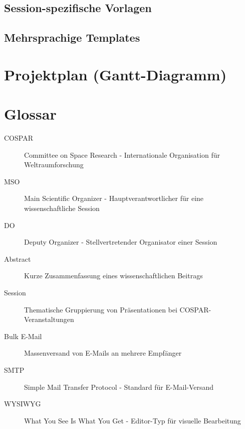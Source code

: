\documentclass[11pt,a4paper]{article}
\begin{document}
\subsection{Session-spezifische Vorlagen}

\subsection{Mehrsprachige Templates}

\section{Projektplan (Gantt-Diagramm)}

\section{Glossar}
\begin{description}
    \item[COSPAR] Committee on Space Research - Internationale Organisation für Weltraumforschung
    \item[MSO] Main Scientific Organizer - Hauptverantwortlicher für eine wissenschaftliche Session
    \item[DO] Deputy Organizer - Stellvertretender Organisator einer Session
    \item[Abstract] Kurze Zusammenfassung eines wissenschaftlichen Beitrags
    \item[Session] Thematische Gruppierung von Präsentationen bei COSPAR-Veranstaltungen
    \item[Bulk E-Mail] Massenversand von E-Mails an mehrere Empfänger
    \item[SMTP] Simple Mail Transfer Protocol - Standard für E-Mail-Versand
    \item[WYSIWYG] What You See Is What You Get - Editor-Typ für visuelle Bearbeitung
\end{description}
\end{document}
